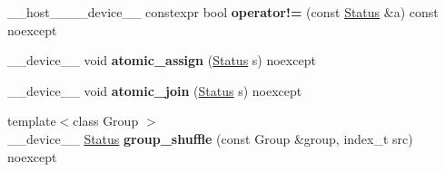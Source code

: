 \begin{DoxyCompactItemize}
\+\_\+\+\_\+host\+\_\+\+\_\+\+\_\+\+\_\+device\+\_\+\+\_\+ constexpr bool {\bfseries operator!=} (const \hyperlink{classwarpcore_1_1Status}{Status} \&a) const noexcept
\item 
\mbox{\label{classwarpcore_1_1Status_ae9b0969040d2aa921e5fb0d9f7eefa79}} 
\+\_\+\+\_\+device\+\_\+\+\_\+ void {\bfseries atomic\+\_\+assign} (\hyperlink{classwarpcore_1_1Status}{Status} s) noexcept
\item 
\mbox{\label{classwarpcore_1_1Status_a30340aaa237bc68fa8ab08d1ac4a3edb}} 
\+\_\+\+\_\+device\+\_\+\+\_\+ void {\bfseries atomic\+\_\+join} (\hyperlink{classwarpcore_1_1Status}{Status} s) noexcept
\item 
\mbox{\label{classwarpcore_1_1Status_a9b603136ac0c25c0d1ad948f3fae5658}} 
{\footnotesize template$<$class Group $>$ }\\\+\_\+\+\_\+device\+\_\+\+\_\+ \hyperlink{classwarpcore_1_1Status}{Status} {\bfseries group\+\_\+shuffle} (const Group \&group, index\+\_\+t src) noexcept
\end{DoxyCompactItemize}
